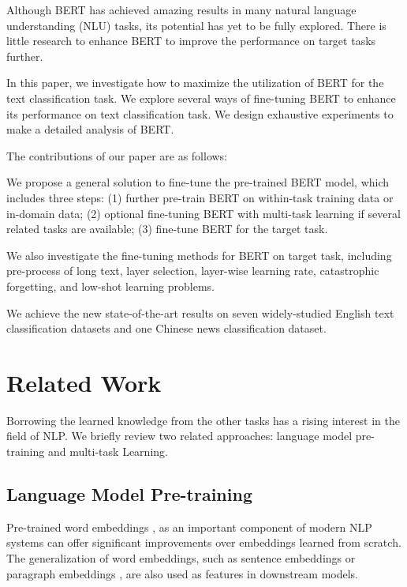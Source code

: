 \documentclass[11pt,a4paper]{article}
\theoremstyle{definition}
\begin{document}
\begin{CJK*}{UTF8}{gbsn}
Although BERT has achieved amazing results in many natural language understanding (NLU) tasks, its potential has yet to be fully explored. There is little research to enhance BERT to improve the performance on target tasks further.

In this paper, we investigate how to maximize the utilization of BERT for the text classification task. We explore several ways of fine-tuning BERT to enhance its performance on text classification task. We design exhaustive experiments to make a detailed analysis of BERT.


The contributions of our paper are as follows:
\begin{itemize*}
	\item
	We propose a general solution to fine-tune the pre-trained BERT model, which includes three steps: (1) further pre-train BERT on within-task training data or in-domain data; (2) optional fine-tuning BERT with multi-task learning if several related tasks are available; (3) fine-tune BERT for the target task.
	\item We also investigate the fine-tuning methods for BERT on target task, including pre-process of long text, layer selection, layer-wise learning rate, catastrophic forgetting, and low-shot learning problems.
	\item
	We achieve the new state-of-the-art results on seven widely-studied English text classification datasets and one Chinese news classification dataset.
	
\end{itemize*}
	
\section{Related Work}
 Borrowing the learned knowledge from the other tasks has a rising interest in the field of NLP. We briefly review two related approaches: language model pre-training and multi-task Learning.

\subsection{Language Model Pre-training}

	Pre-trained word embeddings \cite{mikolov2013distributed,pennington2014glove}, as an important component of modern NLP systems can offer significant improvements over embeddings learned from scratch. The generalization of word embeddings, such as sentence embeddings \cite{kiros2015skip,logeswaran2018efficient} or paragraph embeddings \cite{le2014distributed}, are also used as features in downstream models.
	

\end{CJK*}
\end{document}
